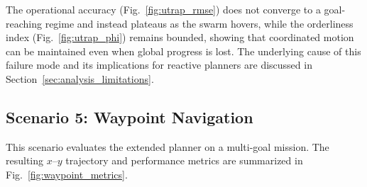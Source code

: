 \documentclass[pdflatex,sn-basic]{sn-jnl}%
\begin{document}
        The operational accuracy (Fig.~\ref{fig:utrap_rmse}) does not converge to a goal-reaching regime and instead plateaus as the swarm hovers, while the orderliness index (Fig.~\ref{fig:utrap_phi}) remains bounded, showing that coordinated motion can be maintained even when global progress is lost. The underlying cause of this failure mode and its implications for reactive planners are discussed in Section~\ref{sec:analysis_limitations}.

    \subsection{Scenario 5: Waypoint Navigation}
        This scenario evaluates the extended planner on a multi-goal mission. The resulting $x$--$y$ trajectory and performance metrics are summarized in Fig.~\ref{fig:waypoint_metrics}.
\end{document}
